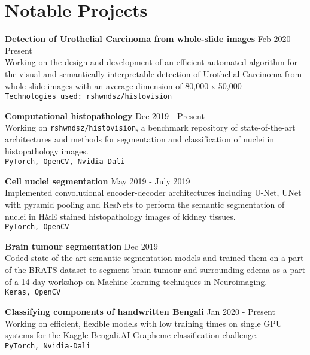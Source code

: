 \documentclass[letterpaper]{article}
\renewenvironment{itemize}{
  \begin{list}{}{
    \setlength{\leftmargin}{1.5em}
  }
}{
  \end{list}
}
\newcommand{\smallGreyFont}[1]{\textcolor{black!80}{\small{#1}}}
\begin{document}
\section*{Notable Projects}
  \begin{itemize}
  \item
    \textbf{Detection of Urothelial Carcinoma from whole-slide images}
    \hfill{\smallGreyFont{Feb 2020 - Present}}\\
      Working on the design and development of an efficient automated algorithm for the  visual and semantically interpretable detection of Urothelial Carcinoma from whole slide images with an average dimension of 80,000 x 50,000 \\
      \texttt{\smallGreyFont{Technologies used: rshwndsz/histovision}}

    \item
    \textbf{Computational histopathology}
    \hfill{\smallGreyFont{Dec 2019 - Present}}\\
      Working on \texttt{rshwndsz/histovision}, a benchmark repository of state-of-the-art architectures and methods for segmentation and classification of nuclei in histopathology images.\\
      \texttt{\smallGreyFont{PyTorch, OpenCV, Nvidia-Dali}}

    \item
    \textbf{Cell nuclei segmentation}
    \hfill{\smallGreyFont{May 2019 - July 2019}}\\
      Implemented convolutional encoder-decoder architectures including U-Net, UNet with pyramid pooling and ResNets to perform the semantic segmentation of nuclei in H\&E stained histopathology images of kidney tissues.\\
      \texttt{\smallGreyFont{PyTorch, OpenCV}}

    \item
    \textbf{Brain tumour segmentation}
    \hfill{\smallGreyFont{Dec 2019}}\\
       Coded state-of-the-art semantic segmentation models and trained them on a part of the BRATS dataset to segment brain tumour and surrounding edema as a part of a 14-day workshop on Machine learning techniques in Neuroimaging.\\
       \texttt{\smallGreyFont{Keras, OpenCV}}

    \item
    \textbf{Classifying components of handwritten Bengali}
    \hfill{\smallGreyFont{Jan 2020 - Present}}\\
      Working on efficient, flexible models with low training times on single GPU systems for the Kaggle Bengali.AI Grapheme classification challenge.\\
      \texttt{\smallGreyFont{PyTorch, Nvidia-Dali}}


\end{itemize}
\end{document}
